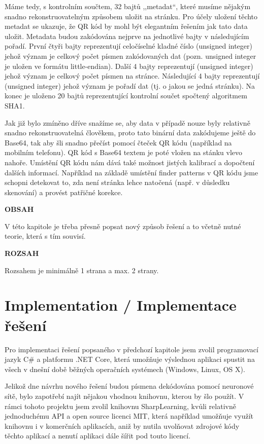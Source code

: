 \documentclass[conference]{IEEEtran}
\begin{document}
Máme tedy, s kontrolním součtem, 32 bajtů ,,metadat``, které musíme nějakým snadno rekonstruovatelným způsobem uložit na stránku. Pro účely uložení těchto metadat se ukazuje, že QR kód by mohl být elegantním řešením jak tato data uložit. Metadata budou zakódována nejprve na jednotlivé bajty v následujícím pořadí. První čtyři bajty reprezentují celočíselné kladné číslo (unsigned integer) jehož význam je celkový počet písmen zakódovaných dat (pozn. unsigned integer je uložen ve formátu little-endian). Další 4 bajty reprezentují (unsigned integer) jehož význam je celkový počet písmen na stránce. Následující 4 bajty reprezentují (unsigned integer) jehož význam je pořadí dat (tj. o jakou se jedná stránku). Na konec je uloženo 20 bajtů reprezentující kontrolní součet spočtený algoritmem SHA1. 


Jak již bylo zmíněno dříve snažíme se, aby data v případě nouze byly relativně snadno rekonstruovatelná člověkem, proto tato binární data zakódujeme ještě do Base64, tak aby šli snadno přečíst pomocí čteček QR kódu (například na mobilním telefonu). QR kód s Base64 textem je poté vložen na stánku vlevo nahoře. Umístění QR kódu nám dává také možnost jistých kalibrací a dopočtení dalších informací. Například na základě umístění finder patterns v QR kódu jsme schopni detekovat to, zda není stránka lehce natočená (např. v důsledku skenování) a provést patřičné korekce.

\textbf{OBSAH}

V této kapitole je třeba přesně popsat nový způsob řešení a to včetně nutné teorie, která s tím souvisí. 

\textbf{ROZSAH}

Rozsahem je minimálně 1 strana a max. 2 strany.

\section{Implementation / Implementace řešení}

Pro implementaci řešení popsaného v předchozí kapitole jsem zvolil programovací jazyk C\# a platformu .NET Core, která umožňuje výslednou aplikaci spustit na všech v dnešní době běžných operačních systémech (Windows, Linux, OS X).

Jelikož dne návrhu nového řešení budou písmena dekódována pomocí neuronové sítě, bylo zapotřebí najít nějakou vhodnou knihovnu, kterou by šlo použít. V rámci tohoto projektu jsem zvolil knihovnu SharpLearning, kvůli relativně jednoduchému API a open source licenci MIT, která například umožňuje využít knihovnu i v komerčních aplikacích, aniž by nutila uvolňovat zdrojové kódy těchto aplikací a nenutí aplikaci dále šířit pod touto licencí.
\end{document}
